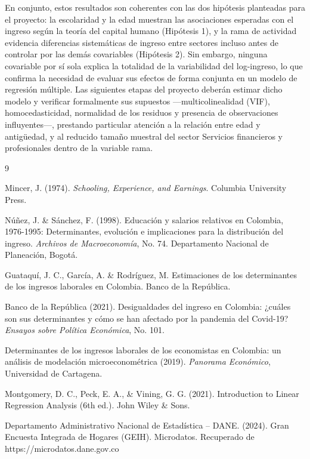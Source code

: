 \documentclass[
  spanish,
  letterpaper,
  DIV=11,
  numbers=noendperiod]{scrartcl}
\begin{document}
En conjunto, estos resultados son coherentes con las dos hipótesis
planteadas para el proyecto: la escolaridad y la edad muestran las
asociaciones esperadas con el ingreso según la teoría del capital humano
(Hipótesis 1), y la rama de actividad evidencia diferencias sistemáticas
de ingreso entre sectores incluso antes de controlar por las demás
covariables (Hipótesis 2). Sin embargo, ninguna covariable por sí sola
explica la totalidad de la variabilidad del log-ingreso, lo que confirma
la necesidad de evaluar sus efectos de forma conjunta en un modelo de
regresión múltiple. Las siguientes etapas del proyecto deberán estimar
dicho modelo y verificar formalmente sus supuestos ---multicolinealidad
(VIF), homocedasticidad, normalidad de los residuos y presencia de
observaciones influyentes---, prestando particular atención a la
relación entre edad y antigüedad, y al reducido tamaño muestral del
sector Servicios financieros y profesionales dentro de la variable rama.

\begin{thebibliography}{9}

Mincer, J. (1974). \textit{Schooling, Experience, and Earnings}. Columbia
University Press.

Núñez, J. \& Sánchez, F. (1998). Educación y salarios relativos en Colombia,
1976-1995: Determinantes, evolución e implicaciones para la distribución del
ingreso. \textit{Archivos de Macroeconomía}, No. 74. Departamento Nacional de
Planeación, Bogotá.

Guataquí, J. C., García, A. \& Rodríguez, M. Estimaciones de los determinantes de
los ingresos laborales en Colombia. Banco de la República.

Banco de la República (2021). Desigualdades del ingreso en Colombia: ¿cuáles son
sus determinantes y cómo se han afectado por la pandemia del Covid-19?
\textit{Ensayos sobre Política Económica}, No. 101.

Determinantes de los ingresos laborales de los economistas en Colombia: un
análisis de modelación microeconométrica (2019). \textit{Panorama Económico},
Universidad de Cartagena.

Montgomery, D. C., Peck, E. A., & Vining, G. G. (2021). Introduction to Linear Regression Analysis (6th ed.). John Wiley & Sons.

Departamento Administrativo Nacional de Estadística – DANE. (2024). Gran Encuesta Integrada de Hogares (GEIH). Microdatos. Recuperado de https://microdatos.dane.gov.co

\end{thebibliography}
\end{document}
